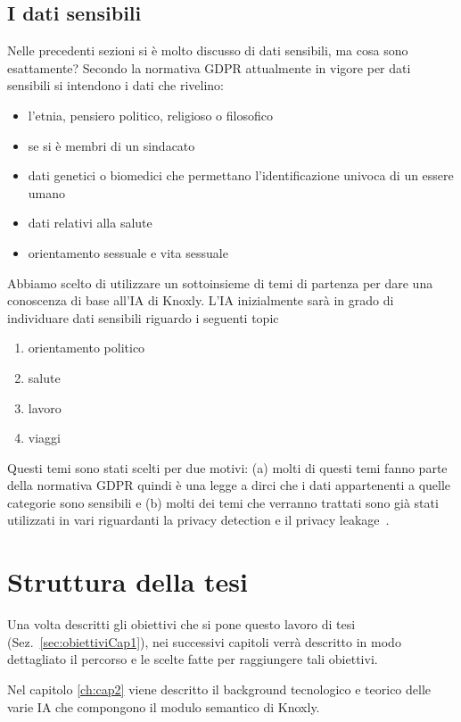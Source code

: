 \subsection{I dati sensibili}
\label{ssec:sensitive_data}
Nelle precedenti sezioni si è molto discusso di dati sensibili, ma cosa sono esattamente? Secondo la normativa GDPR attualmente in vigore per dati sensibili si intendono i dati che rivelino:
\begin{itemize}
    \item l'etnia, pensiero politico, religioso o filosofico
    \item se si è membri di un sindacato
    \item dati genetici o biomedici che permettano l'identificazione univoca di un essere umano
    \item dati relativi alla salute
    \item orientamento sessuale e vita sessuale
\end{itemize}
Abbiamo scelto di utilizzare un sottoinsieme di temi di partenza per dare una conoscenza di base all'IA di Knoxly. L'IA inizialmente sarà in grado di individuare dati sensibili riguardo i seguenti topic
\begin{enumerate}
    \item orientamento politico
    \item salute
    \item lavoro
    \item viaggi
\end{enumerate}
Questi temi sono stati scelti per due motivi: (a) molti di questi temi fanno parte della normativa GDPR quindi è una legge a dirci che i dati appartenenti a quelle categorie sono sensibili e (b) molti dei temi che verranno trattati sono già stati utilizzati in vari riguardanti la privacy detection e il privacy leakage~\cite{looseTweets, MalandrinoScarano, dontTweetThis}.

\section{Struttura della tesi}
\label{sec:res_ottenuti}
Una volta descritti gli obiettivi che si pone questo lavoro di tesi (Sez.~\ref{sec:obiettiviCap1}), nei successivi capitoli verrà descritto in modo dettagliato il percorso e le scelte fatte per raggiungere tali obiettivi.

Nel capitolo \ref{ch:cap2} viene descritto il background tecnologico e teorico delle varie IA che compongono il modulo semantico di Knoxly.

